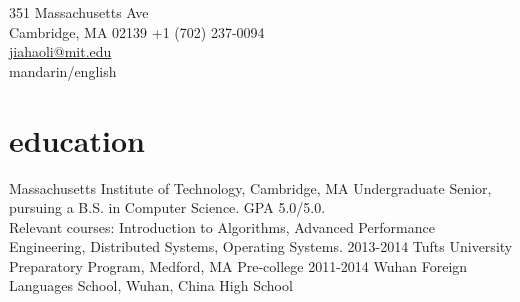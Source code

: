 \documentclass[print]{friggeri-cv} %
\begin{document}
{351 Massachusetts Ave\\
Cambridge, MA 02139}
{+1 (702) 237-0094\\
\href{mailto:jiahaoli@mit.edu}{jiahaoli@mit.edu}\\
mandarin/english} %




\section{education}

\begin{entrylist}
  {Massachusetts Institute of Technology, Cambridge, MA}
  {Undergraduate}
  {Senior, pursuing a B.S. in Computer Science. GPA 5.0/5.0. \\
  Relevant courses: Introduction to Algorithms, Advanced Performance Engineering, Distributed Systems, Operating Systems.}
  \sentry
  {2013-2014}
  {Tufts University Preparatory Program, Medford, MA}
  {Pre-college}
  \sentry
  {2011-2014}
  {Wuhan Foreign Languages School, Wuhan, China}
  {High School}
\end{entrylist}
\end{document}
